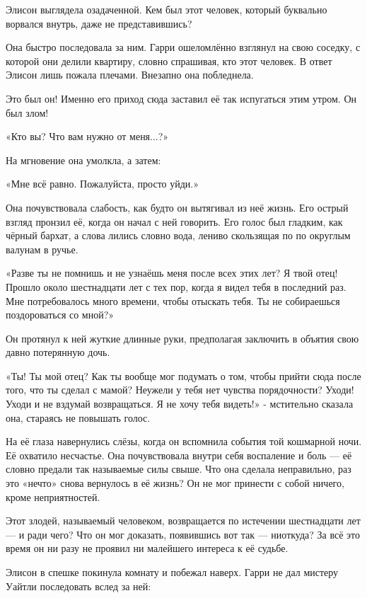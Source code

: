 \documentclass[a4paper,12pt]{book}
\begin{document}
\par
Элисон выглядела озадаченной. Кем был этот человек, который буквально ворвался внутрь, даже не представившись?
\par
Она быстро последовала за ним. Гарри ошеломлённо взглянул на свою соседку, с которой они делили квартиру, словно спрашивая, кто этот человек. В ответ Элисон лишь пожала плечами. Внезапно она побледнела.
\par
Это был он! Именно его приход сюда заставил её так испугаться этим утром. Он был злом!
\par
«Кто вы? Что вам нужно от меня...?»
\par
На мгновение она умолкла, а затем:
\par
«Мне всё равно. Пожалуйста, просто уйди.»
\par
Она почувствовала слабость, как будто он вытягивал из неё жизнь. Его острый взгляд пронзил её, когда он начал с ней говорить. Его голос был гладким, как чёрный бархат, а слова лились словно вода, лениво скользящая по по округлым валунам в ручье.
\par
«Разве ты не помнишь и не узнаёшь меня после всех этих лет? Я твой отец! Прошло около шестнадцати лет с тех пор, когда я видел тебя в последний раз. Мне потребовалось много времени, чтобы отыскать тебя. Ты не собираешься поздороваться со мной?»
\par
Он протянул к ней жуткие длинные руки, предполагая заключить в объятия свою давно потерянную дочь.
\par
«Ты! Ты мой отец? Как ты вообще мог подумать о том, чтобы прийти сюда после того, что ты сделал с мамой? Неужели у тебя нет чувства порядочности? Уходи! Уходи и не вздумай возвращаться. Я не хочу тебя видеть!» - мстительно сказала она, стараясь не повышать голос.
\par
На её глаза навернулись слёзы, когда он вспомнила события той кошмарной ночи. Её охватило несчастье. Она почувствовала внутри себя воспаление и боль — её словно предали так называемые силы свыше. Что она сделала неправильно, раз это «нечто» снова вернулось в её жизнь? Он не мог принести с собой ничего, кроме неприятностей.
\par
Этот злодей, называемый человеком, возвращается по истечении шестнадцати лет — и ради чего? Что он мог доказать, появившись вот так — ниоткуда? За всё это время он ни разу не проявил ни малейшего интереса к её судьбе.
\par
Элисон в спешке покинула комнату и побежал наверх. Гарри не дал мистеру Уайтли последовать вслед за ней:
\end{document}
